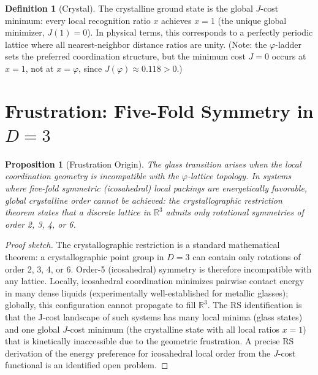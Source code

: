 \documentclass[12pt,a4paper]{article}
\newtheorem{proposition}[theorem]{Proposition}
\theoremstyle{definition}
\newtheorem{definition}[theorem]{Definition}
\theoremstyle{remark}
\begin{document}
\begin{definition}[Crystal]
\label{def:crystal}
The crystalline ground state is the global $J$-cost minimum: every
local recognition ratio $x$ achieves $x = 1$ (the unique global
minimizer, $J(1) = 0$).  In physical terms, this corresponds to a
perfectly periodic lattice where all nearest-neighbor distance ratios
are unity.  (Note: the $\varphi$-ladder sets the preferred
coordination structure, but the minimum cost $J = 0$ occurs at $x = 1$,
not at $x = \varphi$, since $J(\varphi) \approx 0.118 > 0$.)
\end{definition}

\section{Frustration: Five-Fold Symmetry in $D = 3$}
\label{sec:frustration}

\begin{proposition}[Frustration Origin]
\label{thm:frustration}
The glass transition arises when the local coordination geometry is
incompatible with the $\varphi$-lattice topology.  In systems where
five-fold symmetric (icosahedral) local packings are energetically
favorable, global crystalline order cannot be achieved: the
crystallographic restriction theorem states that a discrete lattice
in $\mathbb{R}^3$ admits only rotational symmetries of order 2, 3,
4, or 6.
\end{proposition}

\begin{proof}[Proof sketch]
The crystallographic restriction is a standard mathematical theorem:
a crystallographic point group in $D = 3$ can contain only rotations
of order 2, 3, 4, or 6.  Order-5 (icosahedral) symmetry is therefore
incompatible with any lattice.  Locally, icosahedral coordination
minimizes pairwise contact energy in many dense liquids
(experimentally well-established for metallic glasses); globally,
this configuration cannot propagate to fill $\mathbb{R}^3$.
The RS identification is that the J-cost landscape of such systems
has many local minima (glass states) and one global $J$-cost minimum
(the crystalline state with all local ratios $x = 1$) that is
kinetically inaccessible due to the geometric frustration.  A precise RS
derivation of the energy preference for icosahedral local order from
the $J$-cost functional is an identified open problem.
\end{proof}
\end{document}
